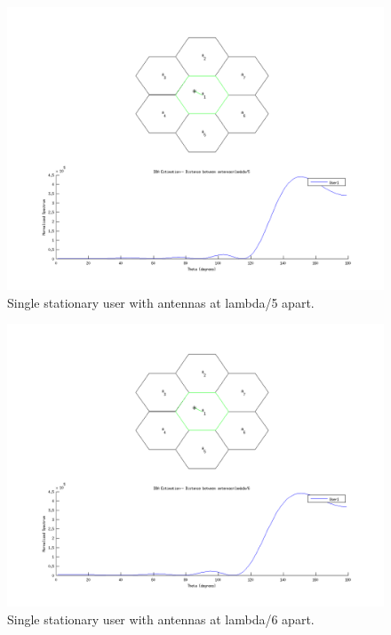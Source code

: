 \documentclass{article}
\begin{document}
\begin{figure}[h]
\centerline{\includegraphics[width=5in]{doc/partB5.png}}
\caption{Single stationary user with antennas at lambda/5 apart.}
\label{partb5}
\end{figure}

\begin{figure}[h]
\centerline{\includegraphics[width=5in]{doc/partB6.png}}
\caption{Single stationary user with antennas at lambda/6 apart.}
\label{partb6}
\end{figure}
\end{document}
